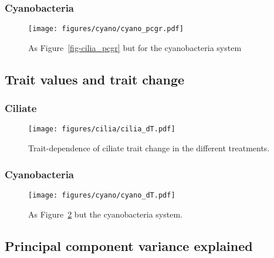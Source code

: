 \documentclass[
  letterpaper,
  DIV=11,
  numbers=noendperiod]{scrartcl}
\begin{document}
\subsubsection{Cyanobacteria}\label{cyanobacteria-1}

\begin{figure}

{\centering \texttt{[image: figures/cyano/cyano\_pcgr.pdf]}

}

\caption{\label{fig-cyano_pcgr}As Figure~\ref{fig-cilia_pcgr} but for
the cyanobacteria system}

\end{figure}

\subsection{Trait values and trait
change}\label{trait-values-and-trait-change}

\subsubsection{Ciliate}\label{ciliate-2}

\begin{figure}

{\centering \texttt{[image: figures/cilia/cilia\_dT.pdf]}

}

\caption{\label{fig-cilia_dT}Trait-dependence of ciliate trait change in
the different treatments.}

\end{figure}

\subsubsection{Cyanobacteria}\label{cyanobacteria-2}

\begin{figure}

{\centering \texttt{[image: figures/cyano/cyano\_dT.pdf]}

}

\caption{\label{fig-cyano_dT}As Figure~\ref{fig-cilia_dT} but the
cyanobacteria system.}

\end{figure}

\subsection{Principal component variance
explained}\label{principal-component-variance-explained}
\end{document}
